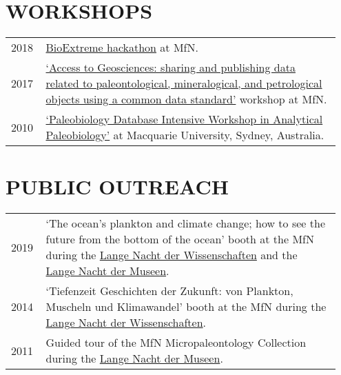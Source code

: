 \documentclass[11pt, a4paper]{article}
\begin{document}
\section{WORKSHOPS}
\begin{longtable}{p{0.1\linewidth} P{0.85\linewidth}}
2018 & \href{https://github.com/macroecology/BioExtremes}{BioExtreme hackathon} at MfN.\\
2017 & \href{https://abcd.biowikifarm.net/wiki/Events:WorkshopEFG2017}{`Access to Geosciences: sharing and publishing data related to paleontological, mineralogical, and petrological objects using a common data standard'} workshop at MfN.\\
2010 & \href{http://fossilworks.org/?page=workshop}{`Paleobiology Database Intensive Workshop in Analytical Paleobiology'} at Macquarie University, Sydney, Australia.\\
\end{longtable}

\section{PUBLIC OUTREACH}
\begin{longtable}{p{0.1\linewidth} P{0.85\linewidth}}
2019 %
 & `The ocean’s plankton and climate change; how to see the future from the bottom of the ocean' booth at the MfN during the \href{http://www.langenachtderwissenschaften.de/}{Lange Nacht der Wissenschaften} and the \href{http://www.lange-nacht-der-museen.de/}{Lange Nacht der Museen}.\\
2014 & `Tiefenzeit Geschichten der Zukunft: von Plankton, Muscheln und Klimawandel' booth at the MfN during the \href{http://www.langenachtderwissenschaften.de/}{Lange Nacht der Wissenschaften}.\\
2011 & Guided tour of the MfN Micropaleontology Collection during the \href{http://www.lange-nacht-der-museen.de/}{Lange Nacht der Museen}.\\
\end{longtable}
\end{document}
